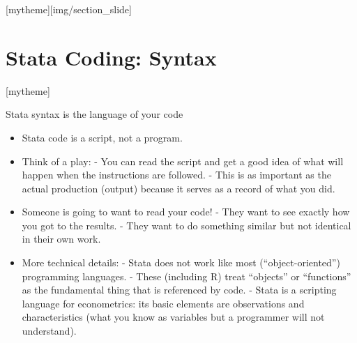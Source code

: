 \documentclass[aspectratio=169]{beamer}
\newcommand{\sectionpic}[2]{
	\setbeamertemplate{section page}[mytheme][#2]
	\section{#1}
	\setbeamertemplate{section page}[mytheme]
}
\begin{document}
\sectionpic{Stata Coding: Syntax}{img/section_slide}


\begin{frame}{Stata syntax is the language of your code}
\begin{multicols}{2}	

	\begin{itemize}[<default overlay specification>]
	\item<1>  Stata code is a script, not a program.
	\item<1>  Think of a play: 
					\newline - You can read the script and get a good idea of what will happen when the instructions are followed.
					\newline - This is as important as the actual production (output) because it serves as a record of what you did.
	\item<1>  Someone is going to want to read your code!
					\newline - They want to see exactly how you got to the results.
					\newline - They want to do something similar but not identical in their own work. 
	\item<1>  More technical details:
					\newline - Stata does not work like most (“object-oriented”) programming languages.
					\newline - These (including R) treat “objects” or “functions” as the fundamental thing that is referenced by code.
					\newline - Stata is a scripting language for econometrics: its basic elements are observations and characteristics (what you know as variables but a programmer will not understand). 
	\end{itemize}

\end{multicols}
\end{frame}
\end{document}
